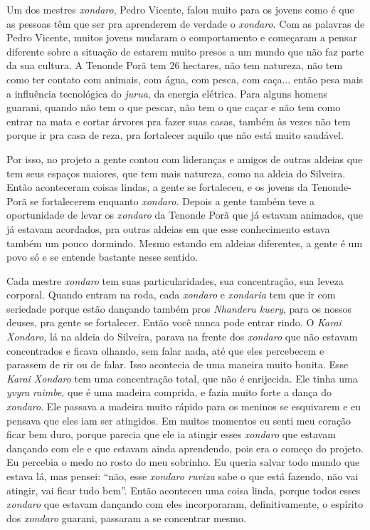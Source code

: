 Um dos mestres \emph{xondaro}, Pedro Vicente, falou muito para os jovens
como é que as pessoas têm que ser pra aprenderem de verdade o
\emph{xondaro}. Com as palavras de Pedro Vicente, muitos jovens mudaram
o comportamento e começaram a pensar diferente sobre a situação de
estarem muito presos a um mundo que não faz parte da sua cultura. A
Tenonde Porã tem 26 hectares, não tem natureza, não tem como ter contato
com animais, com água, com pesca, com caça... então pesa mais a
influência tecnológica do \emph{jurua}, da energia elétrica. Para alguns
homens guarani, quando não tem o que pescar, não tem o que caçar e não
tem como entrar na mata e cortar árvores pra fazer suas casas, também às
vezes não tem porque ir pra casa de reza, pra fortalecer aquilo que não
está muito saudável.

Por isso, no projeto a gente contou com lideranças e amigos de outras
aldeias que tem seus espaços maiores, que tem mais natureza, como na
aldeia do Silveira. Então aconteceram coisas lindas, a gente se
fortaleceu, e os jovens da Tenonde-Porã se fortalecerem enquanto
\emph{xondaro.} Depois a gente também teve a oportunidade de levar os
\emph{xondaro} da Tenonde Porã que já estavam animados, que já estavam
acordados, pra outras aldeias em que esse conhecimento estava também um
pouco dormindo. Mesmo estando em aldeias diferentes, a gente é um povo
só e se entende bastante nesse sentido.

Cada mestre \emph{xondaro} tem suas particularidades, sua concentração,
sua leveza corporal. Quando entram na roda, cada \emph{xondaro} e
\emph{xondaria} tem que ir com seriedade porque estão dançando também
pros \emph{Nhanderu kuery}, para os nossos deuses, pra gente se
fortalecer. Então você nunca pode entrar rindo. O \emph{Karai}
\emph{Xondaro,} lá na aldeia do Silveira, parava na frente dos
\emph{xondaro} que não estavam concentrados e ficava olhando, sem falar
nada, até que eles percebecem e parassem de rir ou de falar. Isso
acontecia de uma maneira muito bonita. Esse \emph{Karai Xondaro} tem uma
concentração total, que não é enrijecida. Ele tinha uma \emph{yvyra}
\emph{raimbe}, que é uma madeira comprida, e fazia muito forte a dança
do \emph{xondaro}. Ele passava a madeira muito rápido para os meninos se
esquivarem e eu pensava que eles iam ser atingidos. Em muitos momentos
eu senti meu coração ficar bem duro, porque parecia que ele ia atingir
esses \emph{xondaro} que estavam dançando com ele e que estavam ainda
aprendendo, pois era o começo do projeto. Eu percebia o medo no rosto do
meu sobrinho. Eu queria salvar todo mundo que estava lá, mas pensei:
``não, esse \emph{xondaro ruvixa} sabe o que está fazendo, não vai
atingir, vai ficar tudo bem''. Então aconteceu uma coisa linda, porque
todos esses \emph{xondaro} que estavam dançando com eles incorporaram,
definitivamente, o espírito dos \emph{xondaro} guarani, passaram a se
concentrar mesmo.

